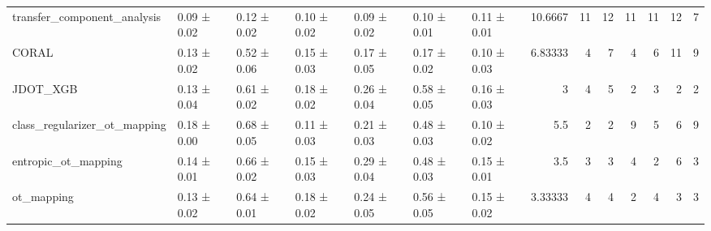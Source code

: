 \begin{tabular}{lllllllrrrrrrr}
 transfer\_component\_analysis  & 0.09 ± 0.02         & 0.12 ± 0.02         & 0.10 ± 0.02         & 0.09 ± 0.02        & 0.10 ± 0.01         & 0.11 ± 0.01        &      10.6667  &                       11 &                       12 &                       11 &                      11 &                       12 &                       7 \\
 CORAL                        & 0.13 ± 0.02         & 0.52 ± 0.06         & 0.15 ± 0.03         & 0.17 ± 0.05        & 0.17 ± 0.02         & 0.10 ± 0.03        &       6.83333 &                        4 &                        7 &                        4 &                       6 &                       11 &                       9 \\
 JDOT\_XGB                     & 0.13 ± 0.04         & 0.61 ± 0.02         & 0.18 ± 0.02         & 0.26 ± 0.04        & 0.58 ± 0.05         & 0.16 ± 0.03        &       3       &                        4 &                        5 &                        2 &                       3 &                        2 &                       2 \\
 class\_regularizer\_ot\_mapping & 0.18 ± 0.00         & 0.68 ± 0.05         & 0.11 ± 0.03         & 0.21 ± 0.03        & 0.48 ± 0.03         & 0.10 ± 0.02        &       5.5     &                        2 &                        2 &                        9 &                       5 &                        6 &                       9 \\
 entropic\_ot\_mapping          & 0.14 ± 0.01         & 0.66 ± 0.02         & 0.15 ± 0.03         & 0.29 ± 0.04        & 0.48 ± 0.03         & 0.15 ± 0.01        &       3.5     &                        3 &                        3 &                        4 &                       2 &                        6 &                       3 \\
 ot\_mapping                   & 0.13 ± 0.02         & 0.64 ± 0.01         & 0.18 ± 0.02         & 0.24 ± 0.05        & 0.56 ± 0.05         & 0.15 ± 0.02        &       3.33333 &                        4 &                        4 &                        2 &                       4 &                        3 &                       3 \\
\hline
\end{tabular}